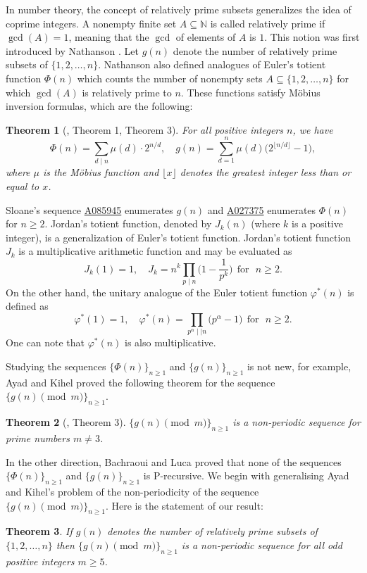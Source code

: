 \documentclass[12pt,reqno]{amsart}
\newtheorem{theorem}{Theorem}[section]
\begin{document}
 In number theory, the concept of relatively prime subsets generalizes the idea of coprime integers. A nonempty finite set $A \subseteq \mathbb{N}$ is called relatively prime if $\gcd(A) = 1$, meaning that the $\gcd$ of elements of $A$ is $1$. This notion was first introduced by Nathanson \cite{1}. Let $g(n)$ denote the number of relatively prime subsets of $ \{1, 2, \dots, n\}$. Nathanson also defined analogues of Euler’s totient function $\Phi(n)$ which counts the number of nonempty sets $A \subseteq \{1, 2, \dots, n\}$ for which $\gcd(A)$ is relatively prime to $n$. These functions satisfy Möbius inversion formulas, which are the following: 
\begin{theorem}[\cite{1}, Theorem 1, Theorem 3] For all positive integers $n$, we have
    $$\Phi(n) = \sum_{d \mid n} \mu(d) \cdot 2^{n/d}, \quad g(n)=\sum_{d=1}^{n}\mu(d)\big(2^{\lfloor n/d\rfloor}-1\big),$$
    where $\mu$ is the Möbius function and $\lfloor x \rfloor$ denotes the greatest integer less than or equal to $x$. 
\end{theorem} 
\noindent
Sloane’s sequence \href{https://oeis.org/A085945}{A085945} enumerates $g(n)$ and \href{https://oeis.org/A027375}{A027375} enumerates $\Phi(n)$ for $n\geq2$. Jordan’s totient function, denoted by $J_k(n)$ (where $k$ is a positive integer), is a generalization of Euler’s totient function. Jordan's totient function $J_k$ is a multiplicative arithmetic function and may be evaluated as
$$J_k(1)=1,\quad J_k=n^k\prod_{p\mid n}\big(1-\frac{1}{p^k}\big)~~\text{for~~}n\geq2.$$
On the other hand, the unitary analogue of the Euler totient function $\varphi^{*}(n)$ is defined as
$$\varphi^*(1)=1,\quad \varphi^{*}(n)=\prod_{p^{\alpha}\mid\mid n}\big(p^{\alpha}-1\big)~~\text{for~~}n\geq2.$$
One can note that $\varphi^*(n)$ is also multiplicative.


Studying the sequences $\{\Phi(n)\}_{n\geq1}$ and $\{g(n)\}_{n\geq1}$ is not new, for example, Ayad and Kihel \cite{r1} proved the following theorem for the sequence $\{g(n) \pmod{m}\}_{n\geq1}$.
\begin{theorem}[\cite{r1}, Theorem 3]
$\{g(n) \pmod{m}\}_{n\geq1}$ is a non-periodic sequence for prime numbers $m\neq3$.
\end{theorem}
In the other direction, Bachraoui and Luca \cite{r3} proved that none of the sequences $\{\Phi(n)\}_{n\geq1}$ and $\{g(n)\}_{n\geq1}$ is P-recursive. 
We begin with generalising  Ayad and Kihel's problem of the non-periodicity of the sequence $\{g(n)\pmod{m}\}_{n\geq1}$. Here is the statement of our result:
\begin{theorem}\label{thm1.3}
If $g(n)$ denotes the number of relatively prime subsets of $\{1, 2, \dots, n\}$ then 
$\{g(n) \pmod{m}\}_{n\geq1}$ is a non-periodic sequence for all odd positive integers $m\geq 5$.
\end{theorem}
\end{document}
